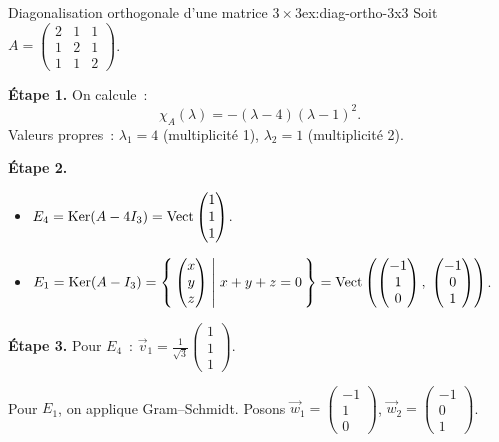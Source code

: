 \begin{example}{Diagonalisation orthogonale d'une matrice $3 \times 3$}{ex:diag-ortho-3x3}
  Soit $A = \begin{pmatrix} 2 & 1 & 1 \\ 1 & 2 & 1 \\ 1 & 1 & 2 \end{pmatrix}$.

  \textbf{Étape 1.} On calcule~:
  \[
    \chi_A(\lambda) = -(\lambda - 4)(\lambda - 1)^2.
  \]
  Valeurs propres~: $\lambda_1 = 4$ (multiplicité 1),
  $\lambda_2 = 1$ (multiplicité 2).

  \textbf{Étape 2.}
  \begin{itemize}
    \item $E_4 = \operatorname{Ker}(A - 4I_3)
      = \operatorname{Vect}\begin{pmatrix} 1 \\ 1 \\ 1 \end{pmatrix}$.
    \item $E_1 = \operatorname{Ker}(A - I_3)
      = \left\{\,\begin{pmatrix} x \\ y \\ z \end{pmatrix}\;\middle|\;x + y + z = 0\,\right\}
      = \operatorname{Vect}\left(\begin{pmatrix} -1 \\ 1 \\ 0 \end{pmatrix},\;
      \begin{pmatrix} -1 \\ 0 \\ 1 \end{pmatrix}\right)$.
  \end{itemize}

  \textbf{Étape 3.} Pour $E_4$~: $\vec{v}_1
  = \frac{1}{\sqrt{3}}\begin{pmatrix} 1 \\ 1 \\ 1 \end{pmatrix}$.

  Pour $E_1$, on applique Gram--Schmidt.
  Posons $\vec{w}_1 = \begin{pmatrix} -1 \\ 1 \\ 0 \end{pmatrix}$,
  $\vec{w}_2 = \begin{pmatrix} -1 \\ 0 \\ 1 \end{pmatrix}$.


\end{example}
